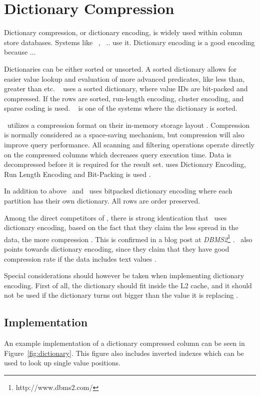 \section{Dictionary Compression}
\label{sec:Dictionary Compression}
Dictionary compression, or dictionary encoding, is widely used within column store databases. Systems like \ibm~\cite{Raman2013-em}, \saph~\cite{Farber2012-vh}.. use it. Dictionary encoding is a good encoding because ... \ea~\cite{Faust2015-ke}

Dictionaries can be either sorted or unsorted. A sorted dictionary allows for easier value lookup and evaluation of more advanced predicates, like less than, greater than etc. \saph~\cite{Farber2012-vh} uses a sorted dictionary, where value IDs are bit-packed and compressed. If the rows are sorted, run-length encoding, cluster encoding, and sparse coding is used. \sapnw~\cite{Lemke2010-is} is one of the systems where the dictionary is sorted.

\oracle~utilizes a compression format on their in-memory storage layout \cite{Oracle2015-fs}. Compression is normally considered as a space-saving mechanism, but compression will also improve query performance. All scanning and filtering operations operate directly on the compressed columns which decreases query execution time. Data is decompressed before it is required for the result set. \oracle uses Dictionary Encoding, Run Length Encoding and Bit-Packing is used \cite{Oracle2015-fs}. 

In addition to above \ibm~and \blink~uses bitpacked dictionary encoding where each partition has their own dictionary. All rows are order preserved.

Among the direct competitors of \genusSoftware, there is strong identication that \qlikview~uses dictionary encoding, based on the fact that they claim the less spread in the data, the more compression \cite{Qlik2011-ef}. This is confirmed in a blog post at \textit{DBMS2}\footnote{http://www.dbms2.com/} \cite{noauthor_undated-js}. \tableau~also points towards dictionary encoding, since they claim that they have good compression rate if the data includes text values \cite{Kamkolkar2015-iq}.

Special considerations should however be taken when implementing dictionary encoding. First of all, the dictionary should fit inside the L2 cache, and it should not be used if the dictionary turns out bigger than the value it is replacing \cite{Holloway2008-rr}. 

\subsection{Implementation}
\label{sub:Implementation}
An example implementation of a dictionary compressed column can be seen in Figure~\ref{fig:dictionary}. This figure also includes inverted indexes which can be used to look up single value positions.


